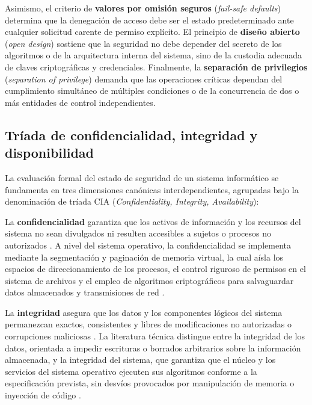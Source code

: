 \documentclass[12pt]{article}
\begin{document}
Asimismo, el criterio de \textbf{valores por omisión seguros} (\textit{fail-safe defaults}) determina que la denegación de acceso debe ser el estado predeterminado ante cualquier solicitud carente de permiso explícito. El principio de \textbf{diseño abierto} (\textit{open design}) sostiene que la seguridad no debe depender del secreto de los algoritmos o de la arquitectura interna del sistema, sino de la custodia adecuada de claves criptográficas y credenciales. Finalmente, la \textbf{separación de privilegios} (\textit{separation of privilege}) demanda que las operaciones críticas dependan del cumplimiento simultáneo de múltiples condiciones o de la concurrencia de dos o más entidades de control independientes.

\subsection{Tríada de confidencialidad, integridad y disponibilidad}\label{subsec:triadaCia}

La evaluación formal del estado de seguridad de un sistema informático se fundamenta en tres dimensiones canónicas interdependientes, agrupadas bajo la denominación de tríada CIA (\textit{Confidentiality, Integrity, Availability}):

La \textbf{confidencialidad} garantiza que los activos de información y los recursos del sistema no sean divulgados ni resulten accesibles a sujetos o procesos no autorizados \parencite[\S 2, p.\ 72]{rfc4949}. A nivel del sistema operativo, la confidencialidad se implementa mediante la segmentación y paginación de memoria virtual, la cual aísla los espacios de direccionamiento de los procesos, el control riguroso de permisos en el sistema de archivos y el empleo de algoritmos criptográficos para salvaguardar datos almacenados y transmisiones de red \parencite[\S 15.1, p.\ 509]{silberschatz2006fundamentos}.

La \textbf{integridad} asegura que los datos y los componentes lógicos del sistema permanezcan exactos, consistentes y libres de modificaciones no autorizadas o corrupciones maliciosas \parencite[\S 2, p.\ 146]{rfc4949}. La literatura técnica distingue entre la integridad de los datos, orientada a impedir escrituras o borrados arbitrarios sobre la información almacenada, y la integridad del sistema, que garantiza que el núcleo y los servicios del sistema operativo ejecuten sus algoritmos conforme a la especificación prevista, sin desvíos provocados por manipulación de memoria o inyección de código \parencite[\S 2.1, p.\ 6]{nistSp800_12}.
\end{document}
